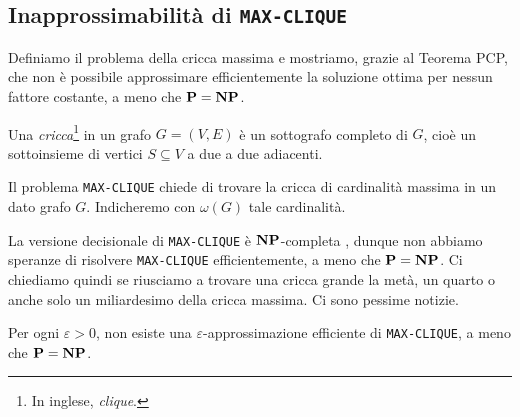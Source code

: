 \subsection{Inapprossimabilità di \texttt{MAX-CLIQUE}}

Definiamo il problema della cricca massima e mostriamo, grazie al
Teorema PCP, che non è possibile approssimare efficientemente la soluzione
ottima per nessun fattore costante, a meno che $\mathbf{P} = \mathbf{NP}$.

\begin{definition}
	Una \emph{cricca}\footnote{In inglese, \emph{clique}.} in un grafo
	$G = (V, E)$ è un sottografo completo di $G$, cioè un sottoinsieme di
	vertici $S \subseteq V$ a due a due adiacenti.
\end{definition}

\begin{definition}
	Il problema \texttt{MAX-CLIQUE} chiede di trovare la cricca di cardinalità
	massima in un dato grafo $G$. Indicheremo con $\omega(G)$ tale cardinalità.
\end{definition}

La versione decisionale di \texttt{MAX-CLIQUE} è $\mathbf{NP}$-completa \cite{Karp72},
dunque non abbiamo speranze di risolvere \texttt{MAX-CLIQUE} efficientemente, a
meno che $\mathbf{P} = \mathbf{NP}$. Ci chiediamo quindi se riusciamo a trovare una cricca
grande la metà, un quarto o anche solo un miliardesimo della cricca massima.
Ci sono pessime notizie.

\begin{theorem} \label{thm:max-clique}
	Per ogni $\varepsilon > 0$, non esiste una $\varepsilon$-approssimazione
	efficiente di \texttt{MAX-CLIQUE}, a meno che $\mathbf{P} = \mathbf{NP}$.
\end{theorem}

